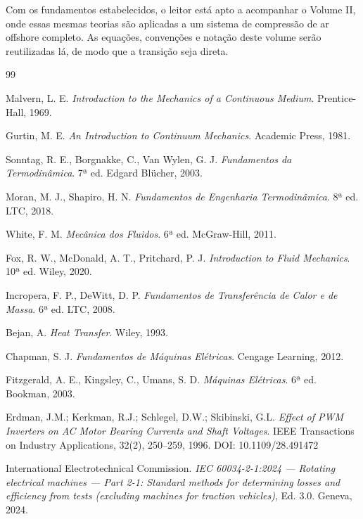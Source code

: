 \documentclass[12pt,a4paper]{article}
\numberwithin{equation}{section}
\numberwithin{table}{section}
\numberwithin{figure}{section}
\begin{document}
Com os fundamentos estabelecidos, o leitor está apto a acompanhar o Volume II,
onde essas mesmas teorias são aplicadas a um sistema de compressão de ar
offshore completo. As equações, convenções e notação deste volume serão
reutilizadas lá, de modo que a transição seja direta.


\newpage
\begin{thebibliography}{99}

 Malvern, L. E. \textit{Introduction to the Mechanics of a Continuous Medium}. Prentice-Hall, 1969.

 Gurtin, M. E. \textit{An Introduction to Continuum Mechanics}. Academic Press, 1981.

 Sonntag, R. E., Borgnakke, C., Van Wylen, G. J. \textit{Fundamentos da Termodinâmica}. 7ª ed. Edgard Blücher, 2003.

 Moran, M. J., Shapiro, H. N. \textit{Fundamentos de Engenharia Termodinâmica}. 8ª ed. LTC, 2018.

 White, F. M. \textit{Mecânica dos Fluidos}. 6ª ed. McGraw-Hill, 2011.

 Fox, R. W., McDonald, A. T., Pritchard, P. J. \textit{Introduction to Fluid Mechanics}. 10ª ed. Wiley, 2020.

 Incropera, F. P., DeWitt, D. P. \textit{Fundamentos de Transferência de Calor e de Massa}. 6ª ed. LTC, 2008.

 Bejan, A. \textit{Heat Transfer}. Wiley, 1993.

 Chapman, S. J. \textit{Fundamentos de Máquinas Elétricas}. Cengage Learning, 2012.

 Fitzgerald, A. E., Kingsley, C., Umans, S. D. \textit{Máquinas Elétricas}. 6ª ed. Bookman, 2003.

 Erdman, J.M.; Kerkman, R.J.; Schlegel, D.W.; Skibinski, G.L. \textit{Effect of PWM Inverters on AC Motor Bearing Currents and Shaft Voltages}. IEEE Transactions on Industry Applications, 32(2), 250--259, 1996. DOI: 10.1109/28.491472

 International Electrotechnical Commission. \textit{IEC 60034-2-1:2024 — Rotating electrical machines — Part 2-1: Standard methods for determining losses and efficiency from tests (excluding machines for traction vehicles)}, Ed. 3.0. Geneva, 2024.


\end{thebibliography}
\end{document}
